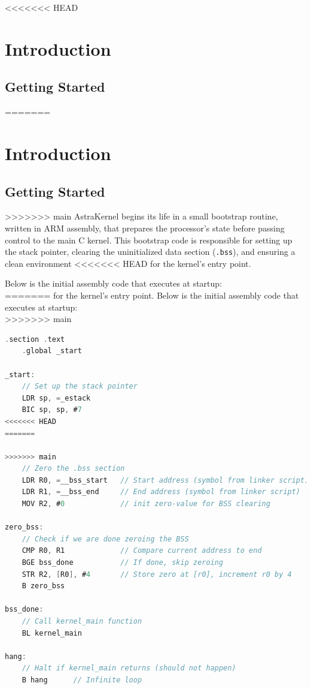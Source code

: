 <<<<<<< HEAD
\newpage
\chapter{Introduction}
\section{Getting Started}


=======
\newpage
\chapter{Introduction}
\section{Getting Started}
>>>>>>> main
AstraKernel begins its life in a small bootstrap routine, written in ARM assembly, 
that prepares the processor’s state before passing control to the main C kernel. 
This bootstrap code is responsible for setting up the stack pointer, clearing 
the uninitialized data section (\texttt{.bss}), and ensuring a clean environment 
<<<<<<< HEAD
for the kernel’s entry point.

Below is the initial assembly code that executes at startup: \\
=======
for the kernel’s entry point. Below is the initial assembly code that executes 
at startup: \\
>>>>>>> main

\begin{lstlisting}[language={C}, caption={Initial bootstrap code for AstraKernel.}, label={lst:bootstrap}]
    .section .text
    .global _start

_start:
    // Set up the stack pointer
    LDR sp, =_estack
    BIC sp, sp, #7
<<<<<<< HEAD
=======

>>>>>>> main
    // Zero the .bss section
    LDR R0, =__bss_start   // Start address (symbol from linker script)
    LDR R1, =__bss_end     // End address (symbol from linker script)
    MOV R2, #0             // init zero-value for BSS clearing

zero_bss:
    // Check if we are done zeroing the BSS
    CMP R0, R1             // Compare current address to end
    BGE bss_done           // If done, skip zeroing
    STR R2, [R0], #4       // Store zero at [r0], increment r0 by 4
    B zero_bss

bss_done:
    // Call kernel_main function
    BL kernel_main

hang:
    // Halt if kernel_main returns (should not happen)
    B hang		// Infinite loop
\end{lstlisting}

